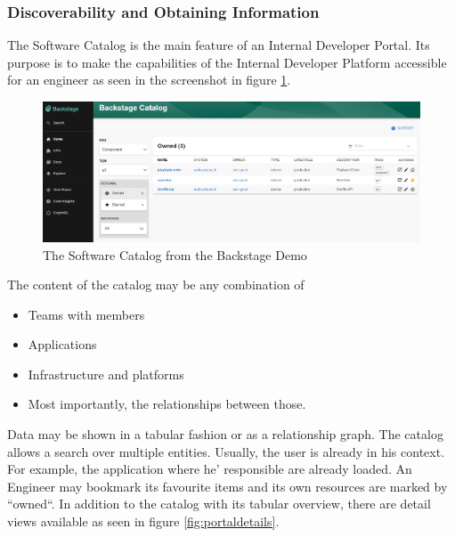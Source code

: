 \documentclass[a4paper,12pt]{article}
\begin{document}
    \subsubsection{Discoverability and Obtaining Information}
    \label{sssec:disc}
    The Software Catalog is the main feature of an Internal Developer Portal.
    Its purpose is to make the capabilities of the Internal Developer Platform accessible for an engineer as seen in the
    screenshot in figure \ref{fig:catalog}.\\

    \begin{figure}[h]
        \includegraphics[width=\linewidth]{backstage_catalog}
        \caption{The Software Catalog from the Backstage Demo\parencite{backstagedemo}}
        \label{fig:catalog}
    \end{figure}
    The content of the catalog may be any combination of
    \begin{itemize}
        \item Teams with members
        \item Applications
        \item Infrastructure and platforms
        \item Most importantly, the relationships between those.
    \end{itemize}
    Data may be shown in a tabular fashion or as a relationship graph.
    The catalog allows a search over multiple entities.
    Usually, the user is already in his context.
    For example, the application where he' responsible are already loaded.
    An Engineer may bookmark its favourite items and its own resources are marked by ``owned``.
    In addition to the catalog with its tabular overview, there are detail views available as seen in figure \ref{fig:portaldetails}.
\end{document}
